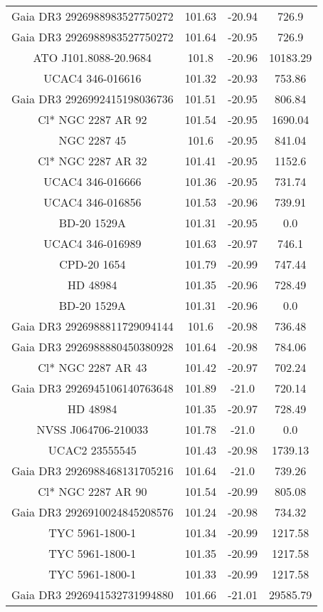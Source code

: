 \begin{table}
\begin{tabular}{cccc}
Gaia DR3 2926988983527750272 & 101.63 & -20.94 & 726.9 \\
Gaia DR3 2926988983527750272 & 101.64 & -20.95 & 726.9 \\
ATO J101.8088-20.9684 & 101.8 & -20.96 & 10183.29 \\
UCAC4 346-016616 & 101.32 & -20.93 & 753.86 \\
Gaia DR3 2926992415198036736 & 101.51 & -20.95 & 806.84 \\
Cl* NGC 2287     AR      92 & 101.54 & -20.95 & 1690.04 \\
NGC  2287    45 & 101.6 & -20.95 & 841.04 \\
Cl* NGC 2287     AR      32 & 101.41 & -20.95 & 1152.6 \\
UCAC4 346-016666 & 101.36 & -20.95 & 731.74 \\
UCAC4 346-016856 & 101.53 & -20.96 & 739.91 \\
BD-20  1529A & 101.31 & -20.95 & 0.0 \\
UCAC4 346-016989 & 101.63 & -20.97 & 746.1 \\
CPD-20  1654 & 101.79 & -20.99 & 747.44 \\
HD  48984 & 101.35 & -20.96 & 728.49 \\
BD-20  1529A & 101.31 & -20.96 & 0.0 \\
Gaia DR3 2926988811729094144 & 101.6 & -20.98 & 736.48 \\
Gaia DR3 2926988880450380928 & 101.64 & -20.98 & 784.06 \\
Cl* NGC 2287     AR      43 & 101.42 & -20.97 & 702.24 \\
Gaia DR3 2926945106140763648 & 101.89 & -21.0 & 720.14 \\
HD  48984 & 101.35 & -20.97 & 728.49 \\
NVSS J064706-210033 & 101.78 & -21.0 & 0.0 \\
UCAC2  23555545 & 101.43 & -20.98 & 1739.13 \\
Gaia DR3 2926988468131705216 & 101.64 & -21.0 & 739.26 \\
Cl* NGC 2287     AR      90 & 101.54 & -20.99 & 805.08 \\
Gaia DR3 2926910024845208576 & 101.24 & -20.98 & 734.32 \\
TYC 5961-1800-1 & 101.34 & -20.99 & 1217.58 \\
TYC 5961-1800-1 & 101.35 & -20.99 & 1217.58 \\
TYC 5961-1800-1 & 101.33 & -20.99 & 1217.58 \\
Gaia DR3 2926941532731994880 & 101.66 & -21.01 & 29585.79 \\

\end{tabular}
\end{table}
